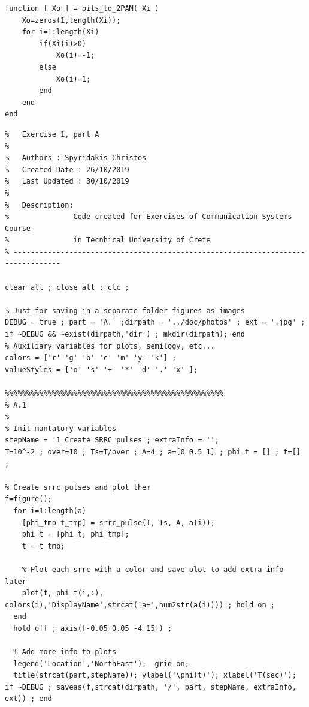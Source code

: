\documentclass[11pt]{article}
\begin{document}
%
%
%
\newpage

\begin{lstlisting}[caption = {\texttt{bits\_to\_2PAM.m}}]
function [ Xo ] = bits_to_2PAM( Xi )
    Xo=zeros(1,length(Xi));    
    for i=1:length(Xi)    
        if(Xi(i)>0)          
            Xo(i)=-1;        
        else
            Xo(i)=1;    
        end
    end
end
\end{lstlisting}

%
%
%
\begin{lstlisting}[caption = {\texttt{part\_a.m}}]
% ---------------------------------------------------------------------------------
%   Exercise 1, part A
%
%   Authors : Spyridakis Christos
%   Created Date : 26/10/2019
%   Last Updated : 30/10/2019
%
%   Description: 
%               Code created for Exercises of Communication Systems Course
%               in Tecnhical University of Crete
% ---------------------------------------------------------------------------------

clear all ; close all ; clc ;

% Just for saving in a separate folder figures as images
DEBUG = true ; part = 'A.' ;dirpath = '../doc/photos' ; ext = '.jpg' ; if ~DEBUG && ~exist(dirpath,'dir') ; mkdir(dirpath); end
% Auxiliary variables for plots, semilogy, etc...
colors = ['r' 'g' 'b' 'c' 'm' 'y' 'k'] ;
valueStyles = ['o' 's' '+' '*' 'd' '.' 'x' ];

%%%%%%%%%%%%%%%%%%%%%%%%%%%%%%%%%%%%%%%%%%%%%%%%%%%
% A.1
%
% Init mantatory variables
stepName = '1 Create SRRC pulses'; extraInfo = '';
T=10^-2 ; over=10 ; Ts=T/over ; A=4 ; a=[0 0.5 1] ; phi_t = [] ; t=[] ; 

% Create srrc pulses and plot them 
f=figure();
  for i=1:length(a)
    [phi_tmp t_tmp] = srrc_pulse(T, Ts, A, a(i));
    phi_t = [phi_t; phi_tmp];
    t = t_tmp;
    
    % Plot each srrc with a color and save plot to add extra info later  
    plot(t, phi_t(i,:), colors(i),'DisplayName',strcat('a=',num2str(a(i)))) ; hold on ; 
  end
  hold off ; axis([-0.05 0.05 -4 15]) ;

  % Add more info to plots                                           
  legend('Location','NorthEast');  grid on;
  title(strcat(part,stepName)); ylabel('\phi(t)'); xlabel('T(sec)');  
if ~DEBUG ; saveas(f,strcat(dirpath, '/', part, stepName, extraInfo, ext)) ; end 


\end{lstlisting}
\end{document}
